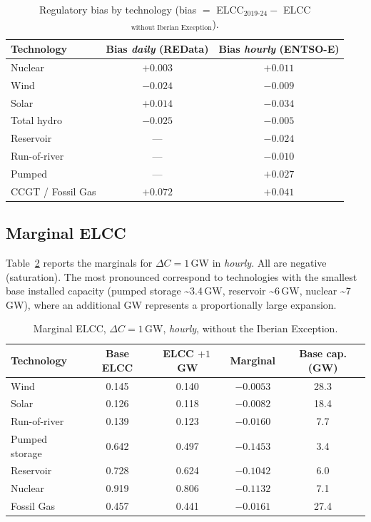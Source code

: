 \documentclass[11pt,a4paper]{article}
\begin{document}
\begin{table}[ht]
\centering
\caption{Regulatory bias by technology (bias $=$ ELCC$_{\text{2019-24}} -$
         ELCC$_{\text{without Iberian Exception}}$).}
\label{tab:excepcion}
\begin{tabular}{lcc}
\toprule
Technology & Bias \emph{daily} (REData) & Bias \emph{hourly} (ENTSO-E) \\
\midrule
Nuclear            & $+0.003$ & $+0.011$ \\
Wind               & $-0.024$ & $-0.009$ \\
Solar              & $+0.014$ & $-0.034$ \\
Total hydro        & $-0.025$ & $-0.005$ \\
\quad Reservoir    & ---      & $-0.024$ \\
\quad Run-of-river & ---      & $-0.010$ \\
\quad Pumped       & ---      & $+0.027$ \\
CCGT / Fossil Gas  & $\mathbf{+0.072}$ & $\mathbf{+0.041}$ \\
\bottomrule
\end{tabular}
\end{table}

\subsection{Marginal ELCC}

Table~\ref{tab:marginal} reports the marginals for $\Delta C = 1$\,GW in
\emph{hourly}. All are negative (saturation). The most pronounced correspond to
technologies with the smallest base installed capacity (pumped storage
\textasciitilde 3.4\,GW, reservoir \textasciitilde 6\,GW, nuclear
\textasciitilde 7\,GW), where an additional GW represents a proportionally large
expansion.

\begin{table}[ht]
\centering
\caption{Marginal ELCC, $\Delta C = 1$\,GW, \emph{hourly}, without the Iberian
         Exception.}
\label{tab:marginal}
\begin{tabular}{lcccc}
\toprule
Technology & Base ELCC & ELCC $+1$\,GW & Marginal & Base cap. (GW) \\
\midrule
Wind              & 0.145 & 0.140 & $-0.0053$ & 28.3 \\
Solar             & 0.126 & 0.118 & $-0.0082$ & 18.4 \\
Run-of-river      & 0.139 & 0.123 & $-0.0160$ & 7.7 \\
Pumped storage    & 0.642 & 0.497 & $\mathbf{-0.1453}$ & 3.4 \\
Reservoir         & 0.728 & 0.624 & $\mathbf{-0.1042}$ & 6.0 \\
Nuclear           & 0.919 & 0.806 & $-0.1132$ & 7.1 \\
Fossil Gas        & 0.457 & 0.441 & $-0.0161$ & 27.4 \\
\bottomrule
\end{tabular}
\end{table}
\end{document}
